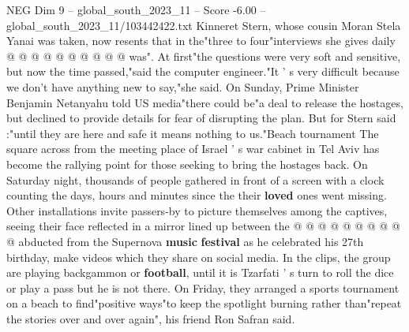 \begin{textsample}{NEG Dim 9 – global\_south\_2023\_11 – Score -6.00 – global\_south\_2023\_11/103442422.txt}
Kinneret Stern, whose cousin Moran Stela Yanai was taken, now resents that in the"three to four"interviews she gives daily @ @ @ @ @ @ @ @ @ @ was".
At first"the questions were very soft and sensitive, but now the time passed,"said the computer engineer."It ' s very difficult because we don't have anything new to say,"she said.
On Sunday, Prime Minister Benjamin Netanyahu told US media"there could be"a deal to release the hostages, but declined to provide details for fear of disrupting the plan.
But for Stern said :"until they are here and safe it means nothing to us."Beach tournament The square across from the meeting place of Israel ' s war cabinet in Tel Aviv has become the rallying point for those seeking to bring the hostages back.
On Saturday night, thousands of people gathered in front of a screen with a clock counting the days, hours and minutes since the their \textbf{loved} ones went missing.
Other installations invite passers-by to picture themselves among the captives, seeing their face reflected in a mirror lined up between the @ @ @ @ @ @ @ @ @ @ abducted from the Supernova \textbf{music} \textbf{festival} as he celebrated his 27th birthday, make videos which they share on social media.
In the clips, the group are playing backgammon or \textbf{football}, until it is Tzarfati ' s turn to roll the dice or play a pass but he is not there.
On Friday, they arranged a sports tournament on a beach to find"positive ways"to keep the spotlight burning rather than"repeat the stories over and over again", his friend Ron Safran said.

\end{textsample}
